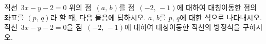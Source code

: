 직선~$3x-y-2=0$ 위의 점~$(a,\,b)$를 점~$(-2,\,-1)$에 대하여 대칭이동한 점의 좌표를 $(p,\,q)$라 할 때, 다음 물음에 답하시오.
 $a$, $b$를 $p$, $q$에 대한 식으로 나타내시오.
 직선~$3x-y-2=0$을 점~$(-2,\,-1)$에 대하여 대칭이동한 직선의 방정식을 구하시오.
